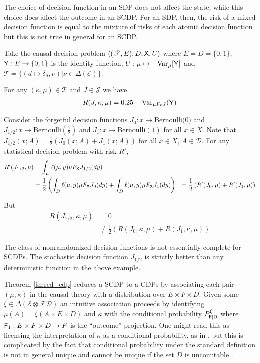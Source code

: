\begin{example}
The choice of decision function in an SDP does not affect the state, while this choice does affect the outcome in an SCDP. For an SDP, then, the risk of a mixed decision function is equal to the mixture of risks of each atomic decision function but this is not true in general for an SCDP.

Take the causal decision problem $\langle (\mathscr{T}, E), D, \mathsf{X}, U \rangle$ where $E=D=\{0,1\}$, $\mathsf{Y}:E\to \{0,1\}$ is the identity function, $U:\mu\mapsto -\text{Var}_\mu[\mathsf{Y}]$ and $\mathscr{T}=\{(d\mapsto \delta_d,\nu)|\nu\in \Delta(\mathcal{E})\}$.

For any $(\kappa,\mu)\in \mathscr{T}$ and $J\in\mathscr{J}$ we have
\begin{align}
    R(J,\kappa,\mu) = 0.25-\text{Var}_{\mu F_{\mathsf{X}} J}(\mathsf{Y})
\end{align}

Consider the forgetful decision functions $J_0:x\mapsto \text{Bernoulli(0)}$ and $J_{1/2}:x\mapsto \mathrm{Bernoulli(\tfrac{1}{2})}$ and $J_1:x\mapsto \mathrm{Bernoulli(1)}$ for all $x\in X$. Note that $J_{1/2}(x;A) = \tfrac{1}{2}(J_0(x;A)+J_1(x;A))$ for all $x\in X$, $A\in \mathcal{D}$. For any statistical decision problem with risk $R'$,
\begin{align}
    R'(J_{1/2},\mu) &= \int_D \ell(\mu,y) \mu F_{\mathsf{X}} J_{1/2}(dy)\\
                    &= \frac{1}{2}\left(\int_D \ell(\mu,y) \mu F_{\mathsf{X}} J_{0}(dy) + \int_D \ell(\mu,y) \mu F_{\mathsf{X}} J_{1}(dy)\right)
                    &= \frac{1}{2}\left(R'(J_0,\mu) + R'(J_1,\mu) \right)
\end{align}

But
\begin{align}
    R(J_{1/2},\kappa,\mu) &= 0\\
                          &\neq \frac{1}{2}\left(R(J_0,\kappa,\mu) + R(J_1,\kappa,\mu)\right)
\end{align}

\end{example}

\begin{corollary}
The class of nonramdomized decision functions is not essentially complete for SCDPs. The stochastic decision function $J_{1/2}$ is strictly better than any deterministic function in the above example.
\end{corollary}

Theorem \ref{th:red_cdp} reduces a SCDP to a CDPs by associating each pair $(\mu,\kappa)$ in the causal theory with a distribution over $E\times F\times D$. Given some $\xi\in \Delta(\mathcal{E}\otimes\mathcal{F} \mathcal{D})$ an intuitive association proceeds by identifying $\mu(A)=\xi(A\times E\times D)$ and $\kappa$ with the conditional probability $P^\xi_{\mathsf{F}|\mathsf{D}}$ where $\mathsf{F}_1:E\times F\times D\to F$ is the ``outcome'' projection. One might read this as licensing the interpretation of $\kappa$ as a conditional probability, as in \cite{dawid_beware_2010}, but this is complicated by the fact that conditional probability under the standard definition is not in general unique and cannot be unique if the set $D$ is uncountable \cite{hajek_what_2003}. 

